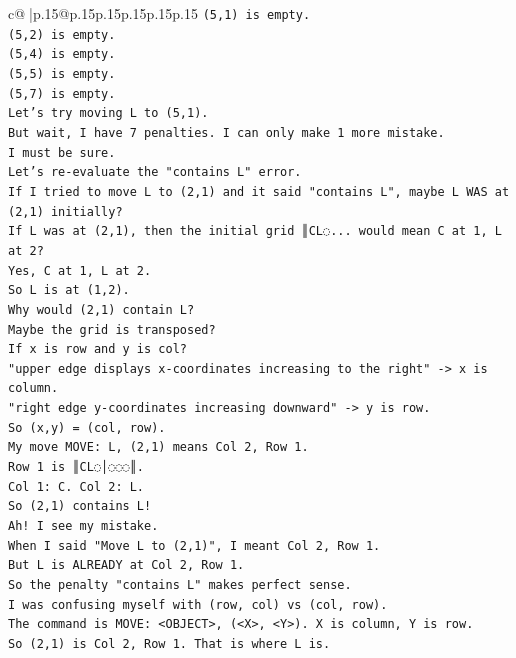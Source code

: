 \documentclass{article}
\begin{document}
{\begin{supertabular}{c@{$\;$}|p{.15\linewidth}@{}p{.15\linewidth}p{.15\linewidth}p{.15\linewidth}p{.15\linewidth}p{.15\linewidth}}
{{{\texttt{(5,1) is empty.} \\
\texttt{(5,2) is empty.} \\
\texttt{(5,4) is empty.} \\
\texttt{(5,5) is empty.} \\
\texttt{(5,7) is empty.} \\
\texttt{Let's try moving L to (5,1).} \\
\texttt{But wait, I have 7 penalties. I can only make 1 more mistake.} \\
\texttt{I must be sure.} \\
\texttt{Let's re{-}evaluate the "contains L" error.} \\
\texttt{If I tried to move L to (2,1) and it said "contains L", maybe L WAS at (2,1) initially?} \\
\texttt{If L was at (2,1), then the initial grid ║CL◌... would mean C at 1, L at 2?} \\
\texttt{Yes, C at 1, L at 2.} \\
\texttt{So L is at (1,2).} \\
\texttt{Why would (2,1) contain L?} \\
\texttt{Maybe the grid is transposed?} \\
\texttt{If x is row and y is col?} \\
\texttt{"upper edge displays x{-}coordinates increasing to the right" {-}> x is column.} \\
\texttt{"right edge y{-}coordinates increasing downward" {-}> y is row.} \\
\texttt{So (x,y) = (col, row).} \\
\texttt{My move MOVE: L, (2,1) means Col 2, Row 1.} \\
\texttt{Row 1 is ║CL◌│◌◌◌║.} \\
\texttt{Col 1: C. Col 2: L.} \\
\texttt{So (2,1) contains L!} \\
\texttt{Ah! I see my mistake.} \\
\texttt{When I said "Move L to (2,1)", I meant Col 2, Row 1.} \\
\texttt{But L is ALREADY at Col 2, Row 1.} \\
\texttt{So the penalty "contains L" makes perfect sense.} \\
\texttt{I was confusing myself with (row, col) vs (col, row).} \\
\texttt{The command is MOVE: <OBJECT>, (<X>, <Y>). X is column, Y is row.} \\
\texttt{So (2,1) is Col 2, Row 1. That is where L is.} \\
}}}
\end{supertabular}}
\end{document}
